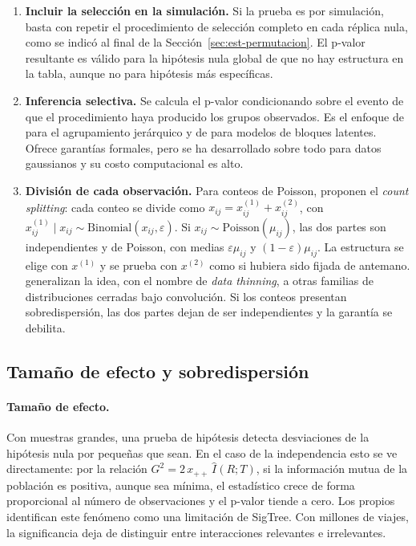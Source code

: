 \begin{enumerate}
  \item \textbf{Incluir la selección en la simulación.} Si la prueba es por
  simulación, basta con repetir el procedimiento de selección completo en cada
  réplica nula, como se indicó al final de la Sección~\ref{sec:est-permutacion}.
  El p-valor resultante es válido para la hipótesis nula global de que no hay
  estructura en la tabla, aunque no para hipótesis más específicas.
  \item \textbf{Inferencia selectiva.} Se calcula el p-valor condicionando sobre
  el evento de que el procedimiento haya producido los grupos observados. Es el
  enfoque de \cite{Gao2024} para el agrupamiento jerárquico y de
  \cite{Watanabe2021si} para modelos de bloques latentes. Ofrece garantías
  formales, pero se ha desarrollado sobre todo para datos gaussianos y su costo
  computacional es alto.
  \item \textbf{División de cada observación.} Para conteos de Poisson,
  \cite{Neufeld2024cs} proponen el \emph{count splitting}: cada conteo se divide
  como $x_{ij} = x^{(1)}_{ij} + x^{(2)}_{ij}$, con $x^{(1)}_{ij} \mid x_{ij} \sim
  \mathrm{Binomial}(x_{ij}, \varepsilon)$. Si $x_{ij} \sim
  \mathrm{Poisson}(\mu_{ij})$, las dos partes son independientes y de Poisson, con
  medias $\varepsilon\mu_{ij}$ y $(1-\varepsilon)\mu_{ij}$. La estructura se
  elige con $x^{(1)}$ y se prueba con $x^{(2)}$ como si hubiera sido fijada de
  antemano. \cite{Neufeld2024dt} generalizan la idea, con el nombre de
  \emph{data thinning}, a otras familias de distribuciones cerradas bajo
  convolución. Si los conteos presentan sobredispersión, las dos partes dejan de
  ser independientes y la garantía se debilita.
\end{enumerate}

\subsection{Tamaño de efecto y sobredispersión}\label{sec:est-efecto}

\paragraph{Tamaño de efecto.} Con muestras grandes, una prueba de hipótesis
detecta desviaciones de la hipótesis nula por pequeñas que sean. En el caso de la
independencia esto se ve directamente: por la relación $G^2 = 2\,x_{++}\,\hat
I(R;T)$, si la información mutua de la población es positiva, aunque sea
mínima, el estadístico crece de forma proporcional al número de observaciones y
el p-valor tiende a cero. Los propios \cite[Sec.~5]{Hu2025} identifican este
fenómeno como una limitación de SigTree. Con millones de viajes, la
significancia deja de distinguir entre interacciones relevantes e irrelevantes.

